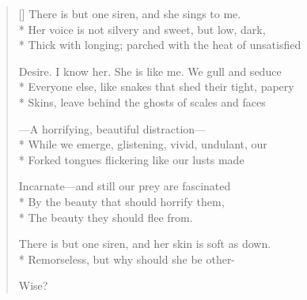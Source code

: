 \label{ch:lear_bk}
\settowidth{\versewidth}{Everyone else, like snakes that shed their tight, papery}
\begin{verse}[\versewidth]
There is but one siren, and she sings to me.\\*
Her voice is not silvery and sweet, but low, dark,\\*
Thick with longing; parched with the heat of unsatisfied

Desire. I know her. She is like me. We gull and seduce\\*
Everyone else, like snakes that shed their tight, papery\\*
Skins, leave behind the ghosts of scales and faces

---A horrifying, beautiful distraction---\\*
While we emerge, glistening, vivid, undulant, our\\*
Forked tongues flickering like our lusts made

Incarnate---and still our prey are fascinated\\*
By the beauty that should horrify them,\\*
The beauty they should flee from.

There is but one siren, and her skin is soft as down.\\*
Remorseless, but why should she be other-

Wise?
\end{verse}

